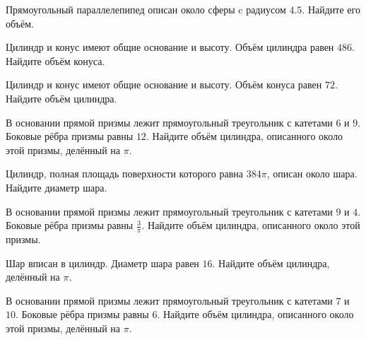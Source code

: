 \documentclass[4apaper]{article}
\begin{document}
\begin{taskBN}{1}
Прямоугольный параллелепипед описан около сферы c радиусом $4.5$. Найдите его объём. 
\end{taskBN}

\begin{taskBN}{2}
Цилиндр и конус имеют общие основание и высоту. Объём цилиндра равен $486$. Найдите объём конуса.
\end{taskBN}

\begin{taskBN}{3}
Цилиндр и конус имеют общие основание и высоту. Объём конуса равен $72$. Найдите объём цилиндра.
\end{taskBN}

\begin{taskBN}{4}
В основании прямой призмы лежит прямоугольный треугольник с катетами $6$ и $9$. Боковые рёбра призмы равны $12$. Найдите объём цилиндра, описанного около этой призмы, делённый на $\pi$.
\end{taskBN}

\begin{taskBN}{5}
 Цилиндр, полная площадь поверхности которого равна $384\pi$, описан около шара. Найдите диаметр шара.
\end{taskBN}

\begin{taskBN}{6}
В основании прямой призмы лежит прямоугольный треугольник с катетами $9$ и $4$. Боковые рёбра призмы равны $\frac{3}{\pi}$. Найдите объём цилиндра, описанного около этой призмы.
\end{taskBN}

\begin{taskBN}{7}
Шар вписан в цилиндр. Диаметр шара равен $16$. Найдите объём цилиндра, делённый на $\pi$.
\end{taskBN}

\begin{taskBN}{8}
В основании прямой призмы лежит прямоугольный треугольник с катетами $7$ и $10$. Боковые рёбра призмы равны $6$. Найдите объём цилиндра, описанного около этой призмы, делённый на $\pi$.
\end{taskBN}
\end{document}
